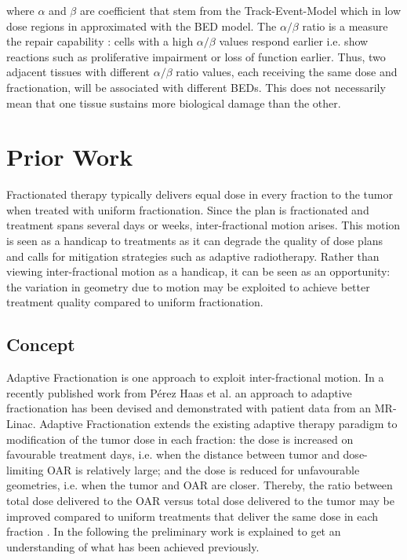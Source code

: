 \documentclass[\relativeRoot/ada.tex]{subfiles}
\begin{document}
where $\alpha$ and $\beta$ are coefficient that stem from the Track-Event-Model which in low dose regions in approximated with the BED model. The $\alpha / \beta$ ratio is a measure the repair capability : cells with a high $\alpha / \beta$ values respond earlier i.e. show reactions such as proliferative impairment or loss of function earlier. Thus, two adjacent tissues with different $\alpha / \beta$ ratio values, each receiving the same dose and fractionation, will be associated with different BEDs. This does not necessarily mean that one tissue sustains more biological damage than the other. \cite{jones_bedrole}

\section{Prior Work}

Fractionated therapy typically delivers equal dose in every fraction to the tumor when treated with uniform fractionation. Since the plan is fractionated and treatment spans several days or weeks, inter-fractional motion arises. This motion is seen as a handicap to treatments as it can degrade the quality of dose plans and calls for mitigation strategies such as adaptive radiotherapy. Rather than viewing inter-fractional motion as a handicap, it can be seen as an opportunity: the variation in geometry due to motion may be exploited to achieve better treatment quality compared to uniform fractionation.

\subsection{Concept}
Adaptive Fractionation \cite{lu_adaptI}\cite{chen_adaptII}\cite{ramakrishnan_adaptIII} is one approach to exploit inter-fractional motion. In a recently published work from Pérez Haas et al. \cite{perezhaas_adaptive} an approach to adaptive fractionation has been devised and demonstrated with patient data from an MR-Linac.
Adaptive Fractionation extends the existing adaptive therapy paradigm to modification of the tumor dose in each fraction: the dose is increased on favourable treatment days, i.e. when the distance between tumor and dose-limiting OAR is relatively large; and the dose is reduced for unfavourable geometries, i.e. when the tumor and OAR are closer. Thereby, the ratio between total dose delivered to the OAR versus total dose delivered to the tumor may be improved compared to uniform treatments that deliver the same dose in each fraction \cite{perezhaas_adaptive}. In the following the preliminary work is explained to get an understanding of what has been achieved previously.
\end{document}
